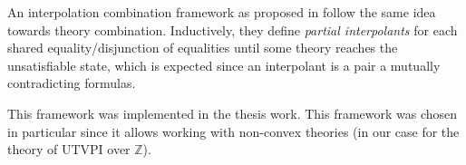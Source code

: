 An interpolation combination framework as proposed in \cite{10.1007/11532231_26}
follow the same idea towards theory combination. Inductively, they define
\emph{partial interpolants} for each shared equality/disjunction of equalities
until some theory reaches the unsatisfiable state, which is expected since 
an interpolant is a pair a mutually contradicting formulas.

This framework was implemented in the thesis work. This framework was chosen
in particular since it allows working with non-convex theories (in our case
for the theory of UTVPI over $\mathbb{Z}$).

